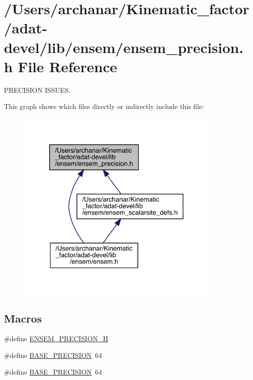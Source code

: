 \hypertarget{adat-devel_2lib_2ensem_2ensem__precision_8h}{}\section{/\+Users/archanar/\+Kinematic\+\_\+factor/adat-\/devel/lib/ensem/ensem\+\_\+precision.h File Reference}
\label{adat-devel_2lib_2ensem_2ensem__precision_8h}


P\+R\+E\+C\+I\+S\+I\+ON I\+S\+S\+U\+ES.  


This graph shows which files directly or indirectly include this file\+:
\nopagebreak
\begin{figure}[H]
\begin{center}
\leavevmode
\includegraphics[width=284pt]{d4/dac/adat-devel_2lib_2ensem_2ensem__precision_8h__dep__incl}
\end{center}
\end{figure}
\subsection*{Macros}
\begin{DoxyCompactItemize}
\item 
\#define \mbox{\hyperlink{adat-devel_2lib_2ensem_2ensem_8h_aef0147df2130d4a59a0e75d96cbe3f4c}{E\+N\+S\+E\+M\+\_\+\+P\+R\+E\+C\+I\+S\+I\+O\+N\+\_\+H}}
\item 
\#define \mbox{\hyperlink{adat-devel_2lib_2ensem_2ensem_8h_a9620d5bc7c8b375f3c2a46815e94ac6f}{B\+A\+S\+E\+\_\+\+P\+R\+E\+C\+I\+S\+I\+ON}}~64
\item 
\#define \mbox{\hyperlink{adat-devel_2lib_2ensem_2ensem__precision_8h_a9620d5bc7c8b375f3c2a46815e94ac6f}{B\+A\+S\+E\+\_\+\+P\+R\+E\+C\+I\+S\+I\+ON}}~64
\end{DoxyCompactItemize}
